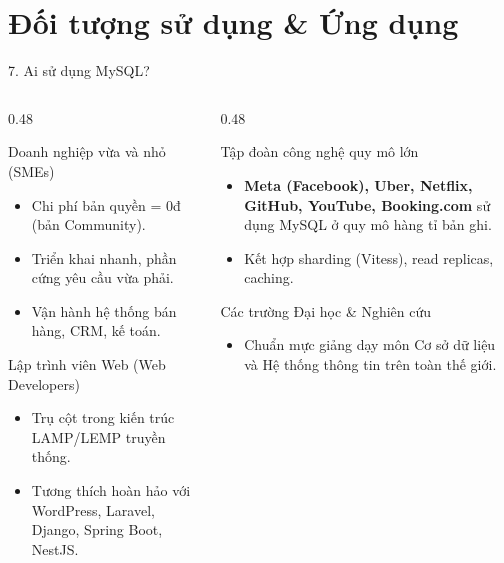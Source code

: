 \documentclass[aspectratio=169,11pt]{beamer}
\begin{document}
\section{Đối tượng sử dụng \& Ứng dụng}
\begin{frame}{7. Ai sử dụng MySQL?}
\begin{columns}[t]
  \begin{column}{0.48\textwidth}
    \begin{block}{Doanh nghiệp vừa và nhỏ (SMEs)}
      \begin{itemize}\footnotesize
        \item Chi phí bản quyền = 0đ (bản Community).
        \item Triển khai nhanh, phần cứng yêu cầu vừa phải.
        \item Vận hành hệ thống bán hàng, CRM, kế toán.
      \end{itemize}
    \end{block}
    \begin{block}{Lập trình viên Web (Web Developers)}
      \begin{itemize}\footnotesize
        \item Trụ cột trong kiến trúc LAMP/LEMP truyền thống.
        \item Tương thích hoàn hảo với WordPress, Laravel, Django, Spring Boot, NestJS.
      \end{itemize}
    \end{block}
  \end{column}
  \begin{column}{0.48\textwidth}
    \begin{block}{Tập đoàn công nghệ quy mô lớn}
      \begin{itemize}\footnotesize
        \item \textbf{Meta (Facebook), Uber, Netflix, GitHub, YouTube, Booking.com} sử dụng MySQL ở quy mô hàng tỉ bản ghi.
        \item Kết hợp sharding (Vitess), read replicas, caching.
      \end{itemize}
    \end{block}
    \begin{block}{Các trường Đại học \& Nghiên cứu}
      \begin{itemize}\footnotesize
        \item Chuẩn mực giảng dạy môn Cơ sở dữ liệu và Hệ thống thông tin trên toàn thế giới.
      \end{itemize}
    \end{block}
  \end{column}
\end{columns}
\end{frame}
\end{document}

